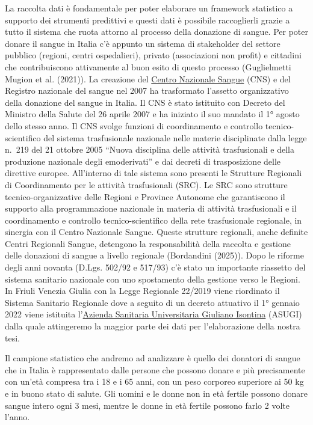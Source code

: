 \documentclass[
  italian,
  a4paper,
  a4paper,
  twoside,
  open=right,
  12pt]{scrbook}
\theoremstyle{definition}
\theoremstyle{remark}
\begin{document}
La raccolta dati è fondamentale per poter elaborare un framework
statistico a supporto dei strumenti predittivi e questi dati è possibile
raccoglierli grazie a tutto il sistema che ruota attorno al processo
della donazione di sangue. Per poter donare il sangue in Italia c'è
appunto un sistema di stakeholder del settore pubblico (regioni, centri
ospedalieri), privato (associazioni non profit) e cittadini che
contribuiscono attivamente al buon esito di questo processo
(Guglielmetti Mugion et al. (2021)). La creazione del
\href{https://www.centronazionalesangue.it/}{Centro Nazionale Sangue}
(CNS) e del Registro nazionale del sangue nel 2007 ha trasformato
l'assetto organizzativo della donazione del sangue in Italia. Il CNS è
stato istituito con Decreto del Ministro della Salute del 26 aprile 2007
e ha iniziato il suo mandato il 1° agosto dello stesso anno. Il CNS
svolge funzioni di coordinamento e controllo tecnico-scientifico del
sistema trasfusionale nazionale nelle materie disciplinate dalla legge
n.~219 del 21 ottobre 2005 ``Nuova disciplina delle attività
trasfusionali e della produzione nazionale degli emoderivati'' e dai
decreti di trasposizione delle direttive europee. All'interno di tale
sistema sono presenti le Strutture Regionali di Coordinamento per le
attività trasfusionali (SRC). Le SRC sono strutture
tecnico-organizzative delle Regioni e Province Autonome che garantiscono
il supporto alla programmazione nazionale in materia di attività
trasfusionali e il coordinamento e controllo tecnico-scientifico della
rete trasfusionale regionale, in sinergia con il Centro Nazionale
Sangue. Queste strutture regionali, anche definite Centri Regionali
Sangue, detengono la responsabilità della raccolta e gestione delle
donazioni di sangue a livello regionale (Bordandini (2025)). Dopo le
riforme degli anni novanta (D.Lgs. 502/92 e 517/93) c'è stato un
importante riassetto del sistema sanitario nazionale con uno spostamento
della gestione verso le Regioni. In Friuli Venezia Giulia con la Legge
Regionale 22/2019 viene riordinato il Sistema Sanitario Regionale dove a
seguito di un decreto attuativo il 1° gennaio 2022 viene istituita
l'\href{https://asugi.sanita.fvg.it/}{Azienda Sanitaria Universitaria
Giuliano Isontina} (ASUGI) dalla quale attingeremo la maggior parte dei
dati per l'elaborazione della nostra tesi.

Il campione statistico che andremo ad analizzare è quello dei donatori
di sangue che in Italia è rappresentato dalle persone che possono donare
e più precisamente con un'età compresa tra i 18 e i 65 anni, con un peso
corporeo superiore ai 50 kg e in buono stato di salute. Gli uomini e le
donne non in età fertile possono donare sangue intero ogni 3 mesi,
mentre le donne in età fertile possono farlo 2 volte l'anno.
\end{document}

